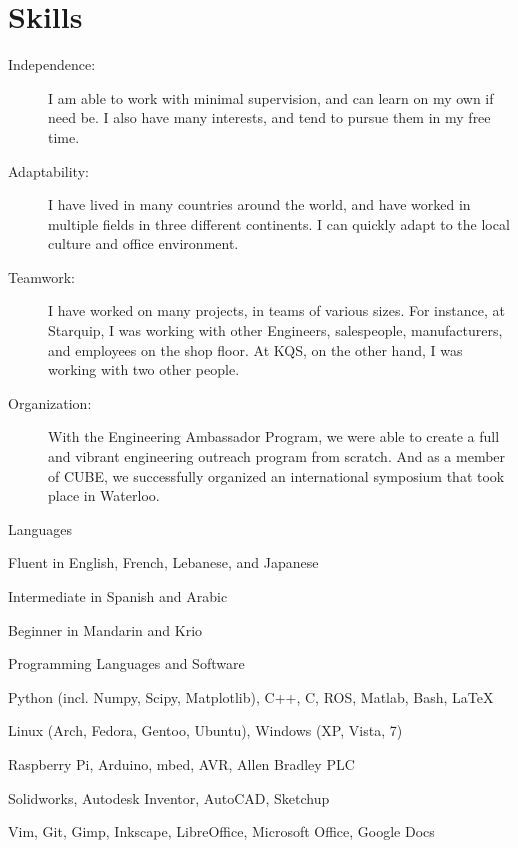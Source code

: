 \documentclass[10pt, a4paper]{article}
\begin{document}
\section{Skills}
\begin{description}
  \item [Independence:] I am able to work with minimal supervision, and can learn on my own if need be.
    I also have many interests, and tend to pursue them in my free time.
  \item [Adaptability:] I have lived in many countries around the world, and have worked in multiple fields in three different continents.
    I can quickly adapt to the local culture and office environment.
  \item [Teamwork:] I have worked on many projects, in teams of various sizes.
    For instance, at Starquip, I was working with other Engineers, salespeople, manufacturers, and employees on the shop floor.
    At KQS, on the other hand, I was working with two other people.
  \item [Organization:] With the Engineering Ambassador Program, we were able to create a full and vibrant engineering outreach program from scratch.
    And as a member of CUBE, we successfully organized an international symposium that took place in Waterloo.
\end{description}

\halfblankline

Languages
\begin{innerlist}
  \item Fluent in English, French, Lebanese, and Japanese
  \item Intermediate in Spanish and Arabic
  \item Beginner in Mandarin and Krio
\end{innerlist}

\halfblankline

Programming Languages and Software
\begin{innerlist}
  \item Python (incl. Numpy, Scipy, Matplotlib), C++, C, ROS, Matlab, Bash, \LaTeX
  \item Linux (Arch, Fedora, Gentoo, Ubuntu), Windows (XP, Vista, 7)
  \item Raspberry Pi, Arduino, mbed, AVR, Allen Bradley PLC
  \item Solidworks, Autodesk Inventor, AutoCAD, Sketchup
  \item Vim, Git, Gimp, Inkscape, LibreOffice, Microsoft Office, Google Docs
\end{innerlist}
\end{document}
